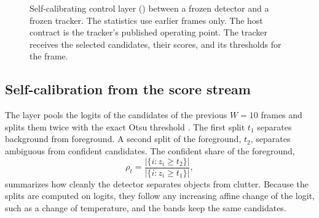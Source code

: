 \begin{figure}[t]
\centering
{}
\caption{Self-calibrating control layer (\scl{}) between a frozen detector and a
frozen tracker. The statistics use earlier frames only. The host contract is the
tracker's published operating point. The tracker receives the selected
candidates, their scores, and its thresholds for the frame.}
\label{fig:arch}
\end{figure}

\subsection{Self-calibration from the score stream}\label{sec:calib}
The layer pools the logits of the candidates of the previous $W=10$ frames and
splits them twice with the exact Otsu threshold \cite{otsu1979}. The first
split $t_1$ separates background from foreground. A second split of the
foreground, $t_2$, separates ambiguous from confident candidates. The
confident share of the foreground,
\begin{equation}
\rho_t=\frac{\left|\{i: z_i\ge t_2\}\right|}{\left|\{i: z_i\ge t_1\}\right|},
\label{eq:rho}
\end{equation}
summarizes how cleanly the detector separates objects from clutter. Because
the splits are computed on logits, they follow any increasing affine change
of the logit, such as a change of temperature, and the bands keep the same
candidates.

